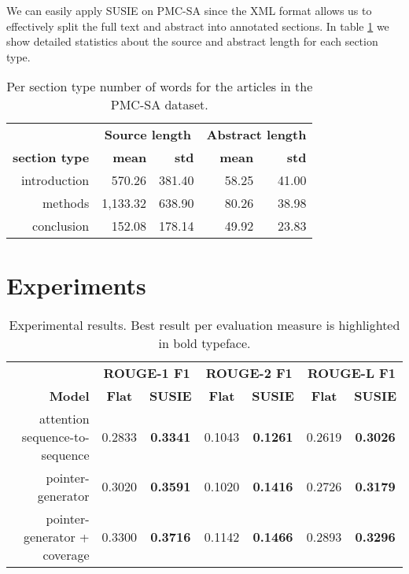 \documentclass[runningheads]{llncs}
\begin{document}
We can easily apply SUSIE on PMC-SA since the XML format allows us to effectively split the full text and abstract into annotated sections. In table \ref{per_sec_exp_stats} we show detailed statistics about the source and abstract length for each section type.

\begin{table}[t!]
\begin{center}
\setlength\tabcolsep{0.2cm}
\begin{tabular}{|r|rr|rr|}
\hline & \multicolumn{2}{c|}{\textbf{Source length}} & \multicolumn{2}{c|}{\textbf{Abstract length}} \\ 
\textbf{section type} & \textbf{mean} & \textbf{std} & \textbf{mean} & \textbf{std}\\\hline
introduction & 570.26 & 381.40 & 58.25 & 41.00\\
methods & 1,133.32 & 638.90 & 80.26 & 38.98 \\
conclusion & 152.08 & 178.14 & 49.92 & 23.83 \\
\hline
\end{tabular}
\end{center}
\caption{\label{per_sec_exp_stats} Per section type number of words for the articles in the PMC-SA dataset.}
\end{table}

\section{Experiments}

\begin{table*}[t!]
\begin{center}
\setlength\tabcolsep{0.1cm}
\begin{tabular}{|r|cc|cc|cc|}
\hline  & \multicolumn{2}{c|}{\textbf{ROUGE-1 F1}} & \multicolumn{2}{c|}{\textbf{ROUGE-2 F1}} & \multicolumn{2}{c|}{\textbf{ROUGE-L F1}}\\
{\bf Model}  & {\bf Flat} & {\bf SUSIE} & {\bf Flat} & {\bf SUSIE} & {\bf Flat} & {\bf SUSIE} \\\hline
attention sequence-to-sequence & 0.2833 & \textbf{0.3341} & 0.1043 & \textbf{0.1261} & 0.2619 & \textbf{0.3026} \\
pointer-generator & 0.3020 & \textbf{0.3591} & 0.1020 & \textbf{0.1416} & 0.2726 & \textbf{0.3179}\\
pointer-generator + coverage & 0.3300 & \textbf{0.3716} & 0.1142 & \textbf{0.1466} & 0.2893 & \textbf{0.3296}\\
\hline
\end{tabular}
\end{center}
\caption{\label{exp_results} Experimental results. Best result per evaluation measure is highlighted in bold typeface.}
\end{table*}
\end{document}
